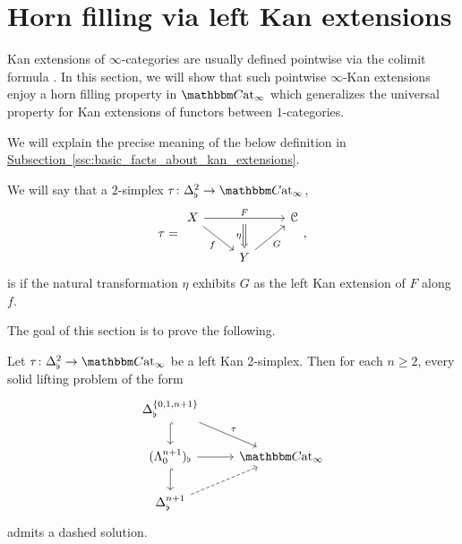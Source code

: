 \documentclass[main.tex]{subfiles}
\begin{document}
\section{Horn filling via left Kan extensions}
\label{sec:horn_filling_via_left_kan_extensions}

Kan extensions of $\infty$-categories are usually defined pointwise via the colimit formula \cite{highertopostheory} \cite{cisinski2019higher}. In this section, we will show that such pointwise $\infty$-Kan extensions enjoy a horn filling property in $\ICCat$ which generalizes the universal property for Kan extensions of functors between $1$-categories.

We will explain the precise meaning of the below definition in \hyperref[ssc:basic_facts_about_kan_extensions]{Subsection~\ref*{ssc:basic_facts_about_kan_extensions}}.

\begin{definition}
  \label{def:left_kan}
  We will say that a $2$-simplex $\tau\colon \Delta^{2}_{\flat} \to \ICCat$,
  \begin{equation}
    \label{eq:prototypical_left_kan_simplex}
    \tau =
    \begin{tikzcd}
      X
      \arrow[dr, swap, "f"]
      \arrow[rr, "F", ""{below, name=M}]
      && \category{C}
      \\
      & Y
      \arrow[ur, swap, "G"]
      \arrow[from=M, Rightarrow, swap, "\eta"]
    \end{tikzcd},
  \end{equation}
  is  if the natural transformation $\eta$ exhibits $G$ as the left Kan extension of $F$ along $f$.
\end{definition}

The goal of this section is to prove the following.

\begin{theorem}
  \label{thm:left_kan_implies_globally_left_kan}
  Let $\tau\colon \Delta^{2}_{\flat} \to \ICCat$ be a left Kan 2-simplex. Then for each $n \geq 2$, every solid lifting problem of the form
  \begin{equation}
    \label{eq:lifting_problems_for_global_kan_extensions}
    \begin{tikzcd}
      \Delta^{\{0,1,n+1\}}_{\flat}
      \arrow[d, hook]
      \arrow[dr, "\tau"]
      \\
      (\Lambda^{n+1}_{0})_{\flat}
      \arrow[r]
      \arrow[d, hook]
      & \ICCat
      \\
      \Delta^{n+1}_{\flat}
      \arrow[ur, dashed]
    \end{tikzcd}
  \end{equation}
  admits a dashed solution.
\end{theorem}
\end{document}
